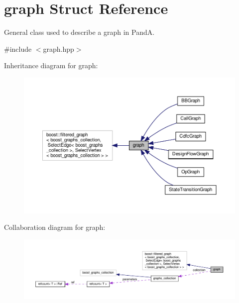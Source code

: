 \hypertarget{structgraph}{}\section{graph Struct Reference}
\label{structgraph}


General class used to describe a graph in PandA.  




{\ttfamily \#include $<$graph.\+hpp$>$}



Inheritance diagram for graph\+:
\nopagebreak
\begin{figure}[H]
\begin{center}
\leavevmode
\includegraphics[width=350pt]{d2/d5a/structgraph__inherit__graph}
\end{center}
\end{figure}


Collaboration diagram for graph\+:
\nopagebreak
\begin{figure}[H]
\begin{center}
\leavevmode
\includegraphics[width=350pt]{d7/d43/structgraph__coll__graph}
\end{center}
\end{figure}
